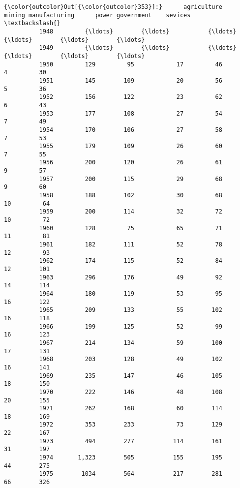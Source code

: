 \documentclass[11pt]{article}
\begin{document}
\begin{Verbatim}[commandchars=\\\{\}]
{\color{outcolor}Out[{\color{outcolor}353}]:}      agriculture     mining manufacturing      power government    sevices  \textbackslash{}
          1948         {\ldots}        {\ldots}           {\ldots}        {\ldots}        {\ldots}        {\ldots}   
          1949         {\ldots}        {\ldots}           {\ldots}        {\ldots}        {\ldots}        {\ldots}   
          1950         129         95            17         46          4         30   
          1951         145        109            20         56          5         36   
          1952         156        122            23         62          6         43   
          1953         177        108            27         54          7         49   
          1954         170        106            27         58          7         53   
          1955         179        109            26         60          7         55   
          1956         200        120            26         61          9         57   
          1957         200        115            29         68          9         60   
          1958         188        102            30         68         10         64   
          1959         200        114            32         72         10         72   
          1960         128         75            65         71         11         81   
          1961         182        111            52         78         12         93   
          1962         174        115            52         84         12        101   
          1963         296        176            49         92         14        114   
          1964         180        119            53         95         16        122   
          1965         209        133            55        102         16        118   
          1966         199        125            52         99         16        123   
          1967         214        134            59        100         17        131   
          1968         203        128            49        102         16        141   
          1969         235        147            46        105         18        150   
          1970         222        146            48        108         20        155   
          1971         262        168            60        114         18        169   
          1972         353        233            73        129         22        167   
          1973         494        277           114        161         31        197   
          1974       1,323        505           155        195         44        275   
          1975        1034        564           217        281         66        326   
          

\end{Verbatim}
\end{document}
